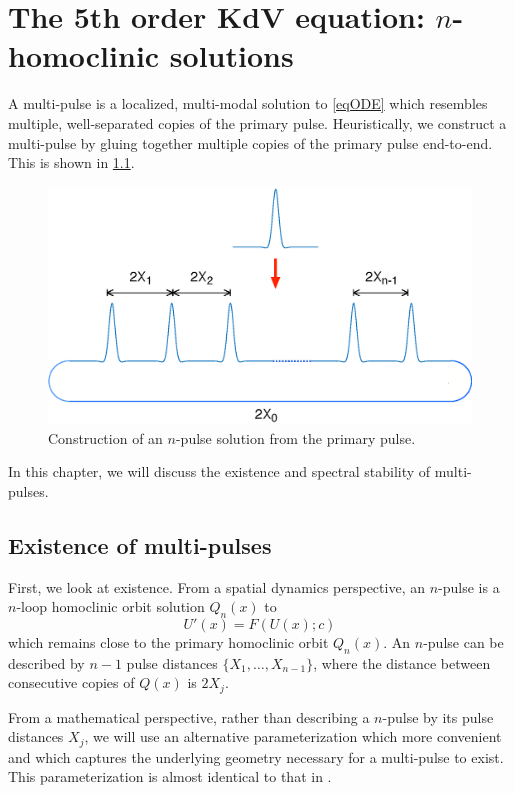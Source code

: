 \documentclass[thesis.tex]{subfiles}
\begin{document}
\iffulldocument\else
	\chapter{The 5th order KdV equation: $n$-homoclinic solutions}
\fi

A multi-pulse is a localized, multi-modal solution to \cref{eqODE} which resembles multiple, well-separated copies of the primary pulse. Heuristically, we construct a multi-pulse by gluing together multiple copies of the primary pulse end-to-end. This is shown in \cref{fig:multipulse}.
\begin{figure}
\includegraphics[width=12cm]{images/kdv5numerics/multipulseperiodic.eps}
\caption{Construction of an $n$-pulse solution from the primary pulse.}
\label{fig:multipulse}
\end{figure}

\noi In this chapter, we will discuss the existence and spectral stability of multi-pulses.

\section{Existence of multi-pulses}\label{sec:multiexistR}

First, we look at existence. From a spatial dynamics perspective, an $n$-pulse is a $n$-loop homoclinic orbit solution $Q_n(x)$ to
\begin{equation}\label{existgenODE1}
U'(x) = F(U(x); c)
\end{equation}
which remains close to the primary homoclinic orbit $Q_n(x)$. An $n$-pulse can be described by $n-1$ pulse distances $\{X_1, \dots, X_{n-1} \}$, where the distance between consecutive copies of $Q(x)$ is $2 X_j$.

From a mathematical perspective, rather than describing a $n$-pulse by its pulse distances $X_j$, we will use an alternative parameterization which more convenient and which captures the underlying geometry necessary for a multi-pulse to exist. This parameterization is almost identical to that in \cite{SandstedeStrut,Sandstede1998}.
\end{document}
